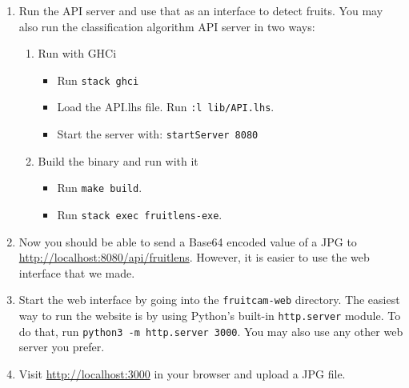\begin{enumerate}
  \item Run the API server and use that as an interface to detect fruits. You may also run the classification algorithm API server in two ways: 
  \begin{enumerate}
      \item Run with GHCi
        \begin{itemize}
            \item Run \verb |stack ghci|
            \item Load the API.lhs file. Run \verb|:l lib/API.lhs|.
            \item Start the server with: \verb|startServer 8080|
        \end{itemize}
      \item Build the binary and run with it
        \begin{itemize}
            \item Run \verb|make build|.
            \item Run \verb|stack exec fruitlens-exe|.
        \end{itemize}
  \end{enumerate}
    \item Now you should be able to send a Base64 encoded value of a JPG to \url{http://localhost:8080/api/fruitlens}. However, it is easier to use the web interface that we made.
    \item Start the web interface by going into the \texttt{fruitcam-web} directory. The easiest way to run the website is by using Python's built-in \texttt{http.server} module. To do that, run \verb|python3 -m http.server 3000|. You may also use any other web server you prefer. 
    \item Visit \url{http://localhost:3000} in your browser and upload a JPG file.
\end{enumerate}

